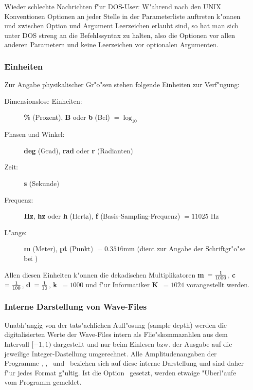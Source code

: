 Wieder schlechte Nachrichten f"ur DOS-User: W"ahrend nach den UNIX
Konventionen Optionen an jeder Stelle in der Parameterliste auftreten
k"onnen und zwischen Option und Argument Leerzeichen erlaubt sind, so
hat man sich unter DOS streng an die Befehlssyntax zu halten, also die
Optionen vor allen anderen Parametern und keine Leerzeichen vor optionalen
Argumenten.

\subsubsection{Einheiten}

Zur Angabe physikalischer Gr"o"sen stehen folgende Einheiten zur 
Verf"ugung:

\begin{description}
\item[Dimensionslose Einheiten:]
  {\bf \%} (Prozent), 
  {\bf B} oder {\bf b} (Bel) $=\log_{10}$
\item[Phasen und Winkel:]
  {\bf deg} (Grad),
  {\bf rad} oder {\bf r} (Radianten)
\item[Zeit:] {\bf s} (Sekunde)
\item[Frequenz:] 
  {\bf Hz}, {\bf hz} oder {\bf h} (Hertz),
  {\bf f} (Basis-Sampling-Frequenz)  $=11025$ Hz
\item[L"ange:]
  {\bf m} (Meter),
  {\bf pt} (Punkt) $=0.3516 $mm 
  (dient zur Angabe der Schriftgr"o"se bei \wplot )
\end{description}

Allen diesen Einheiten k"onnen die dekadischen Multiplikatoren 
{\bf m}~$={1 \over 1000}$, {\bf c}~$={1 \over 100}$, {\bf d}~$={1 \over 10}$,
{\bf k}~$=1000$ und f"ur Informatiker {\bf K}~$=1024$
vorangestellt werden.

\subsubsection{Interne Darstellung von Wave-Files}

Unabh"angig von der tats"achlichen Aufl"osung (sample depth) werden
die digitalisierten Werte der Wave-Files intern als Flie"skommazahlen
aus dem Intervall $[-1,1)$ dargestellt und nur beim Einlesen bzw. der
Ausgabe auf die jeweilige Integer-Dastellung umgerechnet. Alle
Amplitudenangaben der Programme \winf, \wview, \wplot\ und \wfct\
beziehen sich auf diese interne Darstellung und sind daher f"ur
jedes Format g"ultig. Ist die Option \ gesetzt, werden etwaige
"Uberl"aufe vom Programm gemeldet.

